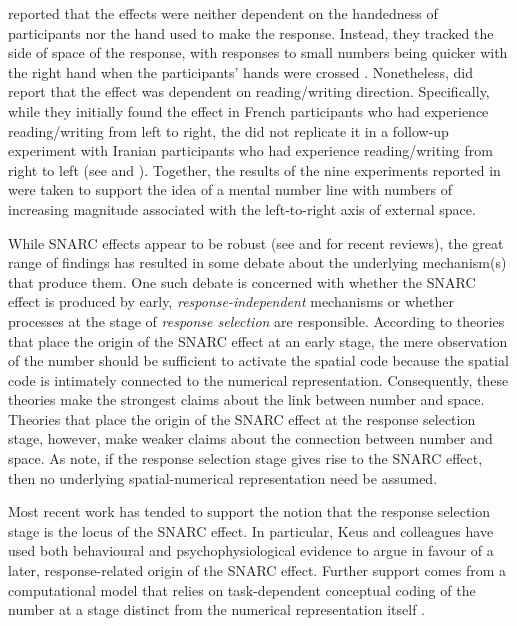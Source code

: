 \documentclass[A4paper,man,floatsintext]{apa6}
\theoremstyle{definition}
\theoremstyle{definition}
\theoremstyle{definition}
\theoremstyle{remark}
\begin{document}
\textcite{Dehaene:1993fc} reported that the effects were neither
dependent on the handedness of participants nor the hand used to make
the response. Instead, they tracked the side of space of the response,
with responses to small numbers being quicker with the right hand when
the participants' hands were crossed \autocite[see,
however,][]{Woods:2006cp}. Nonetheless, \textcite{Dehaene:1993fc} did
report that the effect was dependent on reading/writing direction.
Specifically, while they initially found the effect in French
participants who had experience reading/writing from left to right, the
did not replicate it in a follow-up experiment with Iranian participants
who had experience reading/writing from right to left (see
\textcite{Shaki:2009ch} and \textcite{Zebine}). Together, the results of
the nine experiments reported in \textcite{Dehaene:1993fc} were taken to
support the idea of a mental number line with numbers of increasing
magnitude associated with the left-to-right axis of external space.

While SNARC effects appear to be robust (see \textcite{Wood:2008rev} and
\textcite{Toomarian:2018rev} for recent reviews), the great range of
findings has resulted in some debate about the underlying mechanism(s)
that produce them. One such debate is concerned with whether the SNARC
effect is produced by early, \emph{response-independent} mechanisms or
whether processes at the stage of \emph{response selection} are
responsible. According to theories that place the origin of the SNARC
effect at an early stage, the mere observation of the number should be
sufficient to activate the spatial code because the spatial code is
intimately connected to the numerical representation. Consequently,
these theories make the strongest claims about the link between number
and space. Theories that place the origin of the SNARC effect at the
response selection stage, however, make weaker claims about the
connection between number and space. As \textcite{PecherBoot:2011} note,
if the response selection stage gives rise to the SNARC effect, then no
underlying spatial-numerical representation need be assumed.

Most recent work has tended to support the notion that the response
selection stage is the locus of the SNARC effect. In particular, Keus
and colleagues have used both behavioural \autocite{Keus:2005ho} and
psychophysiological \autocite{Keus:2005jh} evidence to argue in favour
of a later, response-related origin of the SNARC effect. Further support
comes from a computational model that relies on task-dependent
conceptual coding of the number at a stage distinct from the numerical
representation itself \autocite{Gevers:2006model}.
\end{document}
